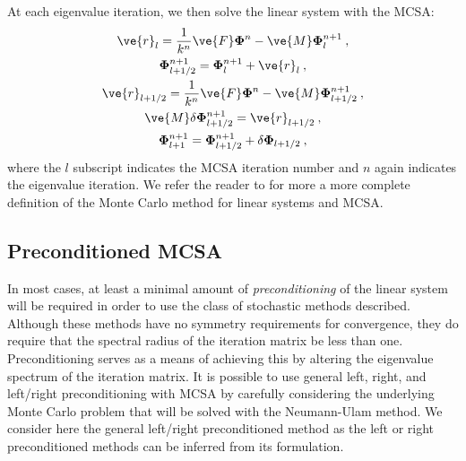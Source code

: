 \documentclass[letterpaper,11pt]{article}
\begin{document}
At each eigenvalue iteration, we then solve the linear system with the
MCSA:
\begin{subequations}
  \begin{gather}
    \ve{r}_{l} = \frac{1}{k^n}\ve{F}\mathbf{\Phi}^n -
    \ve{M}\mathbf{\Phi}^{n+1}_{l}\:,\\
    \mathbf{\Phi}^{n+1}_{l+1/2} = \mathbf{\Phi}^{n+1}_l + \ve{r}_l\:,\\
    \ve{r}_{l+1/2} = \frac{1}{k^n}\ve{F}\mathbf{\Phi}^n -
    \ve{M}\mathbf{\Phi}^{n+1}_{l+1/2}\:,\\
    \ve{M}\delta\mathbf{\Phi}^{n+1}_{l+1/2} = \ve{r}_{l+1/2}\:,\\
    \mathbf{\Phi}^{n+1}_{l+1} = \mathbf{\Phi}^{n+1}_{l+1/2} + \delta
    \mathbf{\Phi}_{l+1/2}\:,
  \end{gather}
  \label{eq:mcsa}
\end{subequations}
where the $l$ subscript indicates the MCSA iteration number and $n$
again indicates the eigenvalue iteration. We refer the reader to
\cite{evans_monte_2012} for more a more complete definition of the
Monte Carlo method for linear systems and MCSA.

\subsection{Preconditioned MCSA}
\label{subsec:preconditioning}
In most cases, at least a minimal amount of \textit{preconditioning}
of the linear system will be required in order to use the class of
stochastic methods described. Although these methods have no symmetry
requirements for convergence, they do require that the spectral radius
of the iteration matrix be less than one. Preconditioning serves as a
means of achieving this by altering the eigenvalue spectrum of the
iteration matrix. It is possible to use general left, right, and left/right
preconditioning with MCSA by carefully considering the underlying
Monte Carlo problem that will be solved with the Neumann-Ulam
method. We consider here the general left/right preconditioned method
as the left or right preconditioned methods can be inferred from its
formulation. 
\end{document}

